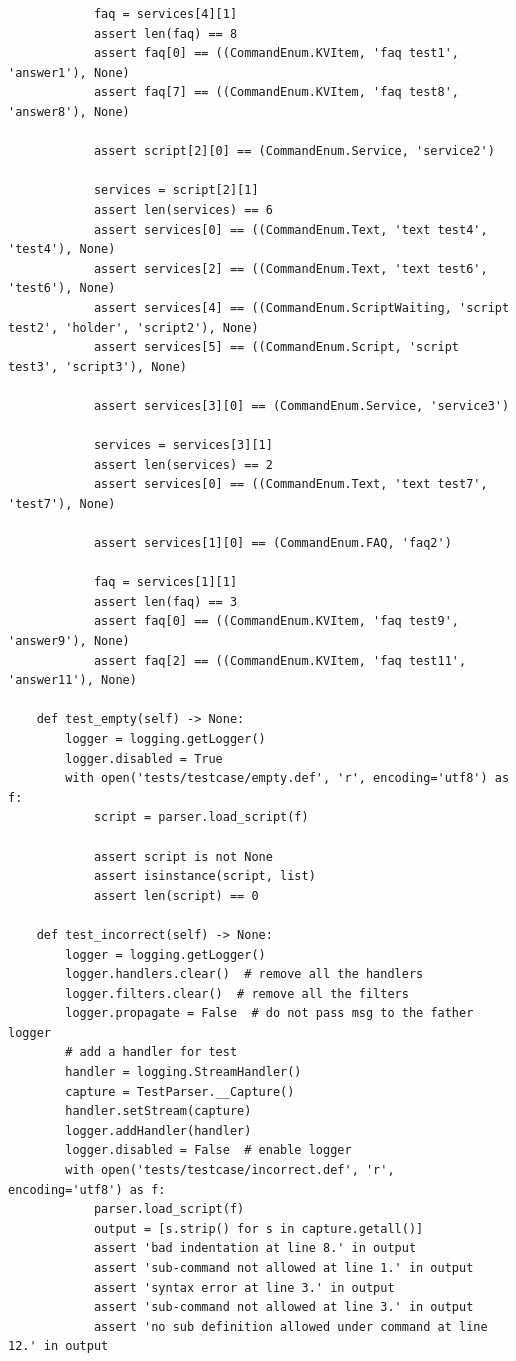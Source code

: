 \documentclass[hyperref]{ctexart}
\begin{document}
\begin{lstlisting}
            faq = services[4][1]
            assert len(faq) == 8
            assert faq[0] == ((CommandEnum.KVItem, 'faq test1', 'answer1'), None)
            assert faq[7] == ((CommandEnum.KVItem, 'faq test8', 'answer8'), None)

            assert script[2][0] == (CommandEnum.Service, 'service2')
            
            services = script[2][1]
            assert len(services) == 6
            assert services[0] == ((CommandEnum.Text, 'text test4', 'test4'), None)
            assert services[2] == ((CommandEnum.Text, 'text test6', 'test6'), None)
            assert services[4] == ((CommandEnum.ScriptWaiting, 'script test2', 'holder', 'script2'), None)
            assert services[5] == ((CommandEnum.Script, 'script test3', 'script3'), None)
            
            assert services[3][0] == (CommandEnum.Service, 'service3')
            
            services = services[3][1]
            assert len(services) == 2
            assert services[0] == ((CommandEnum.Text, 'text test7', 'test7'), None)

            assert services[1][0] == (CommandEnum.FAQ, 'faq2')
            
            faq = services[1][1]
            assert len(faq) == 3
            assert faq[0] == ((CommandEnum.KVItem, 'faq test9', 'answer9'), None)
            assert faq[2] == ((CommandEnum.KVItem, 'faq test11', 'answer11'), None)
        
    def test_empty(self) -> None:
        logger = logging.getLogger()
        logger.disabled = True
        with open('tests/testcase/empty.def', 'r', encoding='utf8') as f:
            script = parser.load_script(f)

            assert script is not None
            assert isinstance(script, list)
            assert len(script) == 0
    
    def test_incorrect(self) -> None:
        logger = logging.getLogger()
        logger.handlers.clear()  # remove all the handlers
        logger.filters.clear()  # remove all the filters
        logger.propagate = False  # do not pass msg to the father logger
        # add a handler for test
        handler = logging.StreamHandler()
        capture = TestParser.__Capture()
        handler.setStream(capture)
        logger.addHandler(handler)
        logger.disabled = False  # enable logger
        with open('tests/testcase/incorrect.def', 'r', encoding='utf8') as f:
            parser.load_script(f)
            output = [s.strip() for s in capture.getall()]
            assert 'bad indentation at line 8.' in output
            assert 'sub-command not allowed at line 1.' in output
            assert 'syntax error at line 3.' in output
            assert 'sub-command not allowed at line 3.' in output
            assert 'no sub definition allowed under command at line 12.' in output
    

\end{lstlisting}
\end{document}
